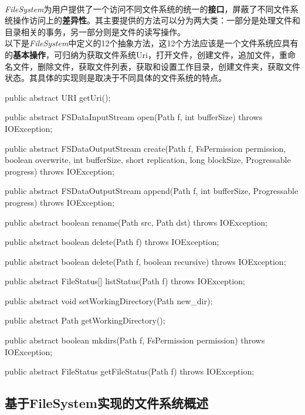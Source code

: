     \\
    \textit{FileSystem}为用户提供了一个访问不同文件系统的统一的\textbf{接口}，屏蔽了不同文件系统操作访问上的\textbf{差异性}。其主要提供的方法可以分为两大类：一部分是处理文件和目录相关的事务，另一部分则是文件的读写操作。\\
    以下是\textit{FileSystem}中定义的12个抽象方法，这12个方法应该是一个文件系统应具有的\textbf{基本操作}，可归纳为获取文件系统Uri，打开文件，创建文件，追加文件，重命名文件，删除文件，获取文件列表，获取和设置工作目录，创建文件夹，获取文件状态。其具体的实现则是取决于不同具体的文件系统的特点。
    \begin{java}[caption=FileSystem abstract method]
public abstract URI getUri();

public abstract FSDataInputStream open(Path f, int bufferSize) throws IOException;

public abstract FSDataOutputStream create(Path f,
    FsPermission permission,
    boolean overwrite,
    int bufferSize,
    short replication,
    long blockSize,
    Progressable progress) throws IOException;

public abstract FSDataOutputStream append(Path f, int bufferSize, Progressable progress) throws IOException;

public abstract boolean rename(Path src, Path dst) throws IOException;

public abstract boolean delete(Path f) throws IOException;

public abstract boolean delete(Path f, boolean recursive) throws IOException;

public abstract FileStatus[] listStatus(Path f) throws IOException;

public abstract void setWorkingDirectory(Path new_dir);

public abstract Path getWorkingDirectory();

public abstract boolean mkdirs(Path f, FsPermission permission) throws IOException;

public abstract FileStatus getFileStatus(Path f) throws IOException;

    \end{java}

\subsection{基于FileSystem实现的文件系统概述}
